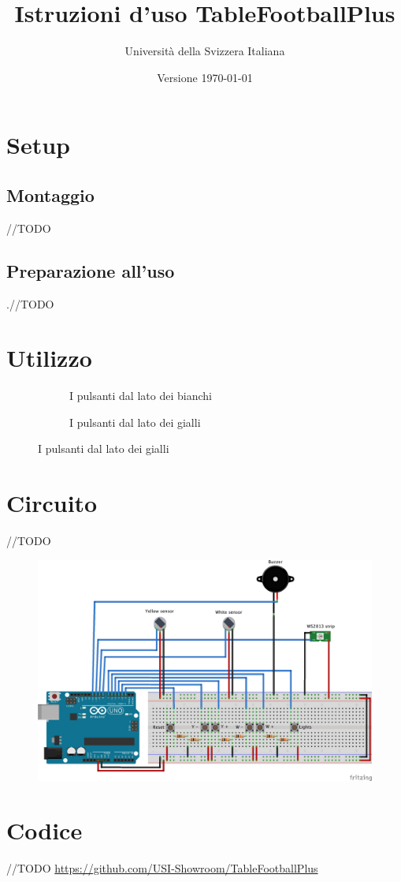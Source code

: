\documentclass[12pt]{article}
\title{Istruzioni d'uso TableFootballPlus}
\author{Università della Svizzera Italiana}
\date{Versione \today}
\begin{document}
\maketitle
\tableofcontents
\newpage

\section{Setup}

	\subsection{Montaggio}

		//TODO
		
		
	\subsection{Preparazione all'uso}
	
		.//TODO
		
		

\section{Utilizzo}	
	
	\begin{figure}[H]
        \begin{subfigure}{0.5\textwidth}
                \caption*{I pulsanti dal lato dei bianchi}
        \end{subfigure}
        \begin{subfigure}{0.5\textwidth}
                \caption*{I pulsanti dal lato dei gialli}
         \end{subfigure}
	\end{figure}
	
	
	
\section{Circuito}

	//TODO
	
	\begin{figure}[H]
                \includegraphics[width=\textwidth]{img/circuit.png}
        \end{figure}
	


\section{Codice}

	//TODO
	\url{https://github.com/USI-Showroom/TableFootballPlus}
\end{document}
